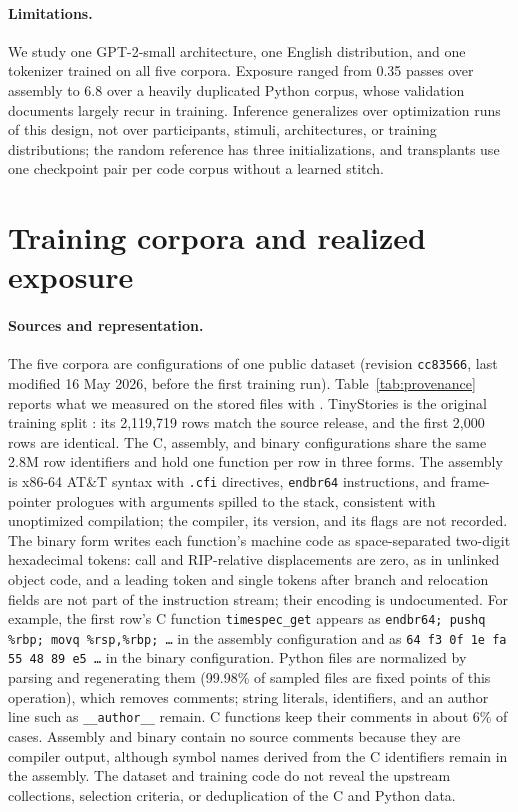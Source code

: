 \documentclass[mlmain]{jmlr}
\begin{document}
\paragraph{Limitations.}
We study one GPT-2-small architecture, one English distribution, and one tokenizer trained on all five corpora. Exposure ranged from 0.35 passes over assembly to 6.8 over a heavily duplicated Python corpus, whose validation documents largely recur in training. Inference generalizes over optimization runs of this design, not over participants, stimuli, architectures, or training distributions; the random reference has three initializations, and transplants use one checkpoint pair per code corpus without a learned stitch.

\clearpage


\clearpage
\appendix

\section{Training corpora and realized exposure}
\label{app:corpora}

\paragraph{Sources and representation.} The five corpora are configurations of one public dataset \citep{parra2026codeenglish} (revision \texttt{cc83566}, last modified 16 May 2026, before the first training run). Table~\ref{tab:provenance} reports what we measured on the stored files with . TinyStories is the original training split \citep{eldan2023tinystories}: its 2,119,719 rows match the source release, and the first 2,000 rows are identical. The C, assembly, and binary configurations share the same 2.8M row identifiers and hold one function per row in three forms. The assembly is x86-64 AT\&T syntax with \texttt{.cfi} directives, \texttt{endbr64} instructions, and frame-pointer prologues with arguments spilled to the stack, consistent with unoptimized compilation; the compiler, its version, and its flags are not recorded. The binary form writes each function's machine code as space-separated two-digit hexadecimal tokens: call and RIP-relative displacements are zero, as in unlinked object code, and a leading token and single tokens after branch and relocation fields are not part of the instruction stream; their encoding is undocumented. For example, the first row's C function \texttt{timespec\_get} appears as \texttt{endbr64; pushq \%rbp; movq \%rsp,\%rbp; \ldots} in the assembly configuration and as \texttt{64 f3 0f 1e fa 55 48 89 e5 \ldots} in the binary configuration. Python files are normalized by parsing and regenerating them (99.98\% of sampled files are fixed points of this operation), which removes comments; string literals, identifiers, and an author line such as \texttt{\_\_author\_\_} remain. C functions keep their comments in about 6\% of cases. Assembly and binary contain no source comments because they are compiler output, although symbol names derived from the C identifiers remain in the assembly. The dataset and training code do not reveal the upstream collections, selection criteria, or deduplication of the C and Python data.
\end{document}
